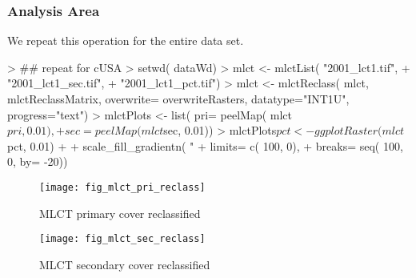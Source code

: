\subsubsection{Analysis Area}
\label{sec:reclass-analysis-area}

We repeat this operation for the entire data set.


\begin{Schunk}
\begin{Sinput}
> ## repeat for cUSA
> setwd( dataWd)
> mlct <- mlctList( "2001_lct1.tif", 
+                   "2001_lct1_sec.tif", 
+                   "2001_lct1_pct.tif")
> mlct  <- mlctReclass( mlct, mlctReclassMatrix, overwrite= overwriteRasters, datatype="INT1U", progress="text")
> mlctPlots <- list( pri= peelMap( mlct$pri, 0.01),
+                     sec= peelMap( mlct$sec, 0.01))
> mlctPlots$pct <- ggplotRaster( mlct$pct, 0.01) + 
+   scale_fill_gradientn( "% confidence", colours=rev( brewer.pal( 7, "YlGn")), 
+                        limits= c( 100, 0),
+                        breaks= seq( 100, 0, by= -20))
\end{Sinput}
\end{Schunk}

\begin{figure} 
\begin{center}

\begin{Schunk}
\end{Schunk}

\texttt{[image: fig\_mlct\_pri\_reclass]}
\end{center} 
\caption{MLCT primary cover reclassified} 
\label{fig:mlct_pri_reclass} 
\end{figure} 


\begin{figure} 
\begin{center}
  
\begin{Schunk}
\end{Schunk}

\texttt{[image: fig\_mlct\_sec\_reclass]}
\end{center} 
\caption{MLCT secondary cover reclassified} 
\label{fig:mlct_sec_reclass} 
\end{figure} 


